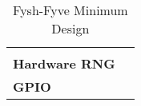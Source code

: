 \newcommand{\ch}[2]{%
	\textbf{#1} & #2 \\%
	\hline%
}
\begin{table}[H]
	\begin{tabularx}{\textwidth}{| a | x |}
		\hline
		 &  \\
		\hline
		\ch{}{}
		\ch{Hardware RNG}{}
		\ch{GPIO}{}
	\end{tabularx}
	\label{Tab:chyp}
	\caption{Fysh-Fyve Minimum Design}
\end{table}

